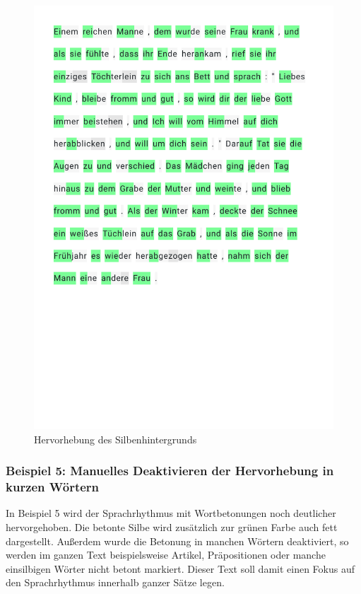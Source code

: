 \begin{figure}[h!]
	\centering
	\includegraphics[width=.7\linewidth, frame]{figures/evaluation/annotation4}
	\caption{Hervorhebung des Silbenhintergrunds}
	\label{fig:evaluation-ex4}
\end{figure}
\newpage

\subsubsection{Beispiel 5: Manuelles Deaktivieren der Hervorhebung in kurzen Wörtern}

In Beispiel 5 wird der Sprachrhythmus mit Wortbetonungen noch deutlicher hervorgehoben. Die betonte Silbe wird zusätzlich zur grünen Farbe auch fett dargestellt. Außerdem wurde die Betonung in manchen Wörtern deaktiviert, so werden im ganzen Text beispielsweise Artikel, Präpositionen oder manche einsilbigen Wörter nicht betont markiert. Dieser Text soll damit einen Fokus auf den Sprachrhythmus innerhalb ganzer Sätze legen.

